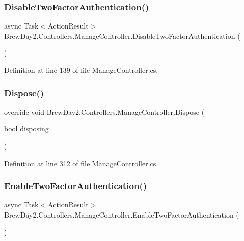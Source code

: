 \subsubsection{\texorpdfstring{Disable\+Two\+Factor\+Authentication()}{DisableTwoFactorAuthentication()}}
{\footnotesize\ttfamily async Task$<$Action\+Result$>$ Brew\+Day2.\+Controllers.\+Manage\+Controller.\+Disable\+Two\+Factor\+Authentication (\begin{DoxyParamCaption}{ }\end{DoxyParamCaption})}



Definition at line 139 of file Manage\+Controller.\+cs.

\mbox{\label{class_brew_day2_1_1_controllers_1_1_manage_controller_a18d6d2893ed6e2675f33512d89997971}} 
\subsubsection{\texorpdfstring{Dispose()}{Dispose()}}
{\footnotesize\ttfamily override void Brew\+Day2.\+Controllers.\+Manage\+Controller.\+Dispose (\begin{DoxyParamCaption}\item[{bool}]{disposing }\end{DoxyParamCaption})\hspace{0.3cm}{\ttfamily [protected]}}



Definition at line 312 of file Manage\+Controller.\+cs.

\mbox{\label{class_brew_day2_1_1_controllers_1_1_manage_controller_a4bd12cede142028030a66cd324d9e7f8}} 
\subsubsection{\texorpdfstring{Enable\+Two\+Factor\+Authentication()}{EnableTwoFactorAuthentication()}}
{\footnotesize\ttfamily async Task$<$Action\+Result$>$ Brew\+Day2.\+Controllers.\+Manage\+Controller.\+Enable\+Two\+Factor\+Authentication (\begin{DoxyParamCaption}{ }\end{DoxyParamCaption})}




